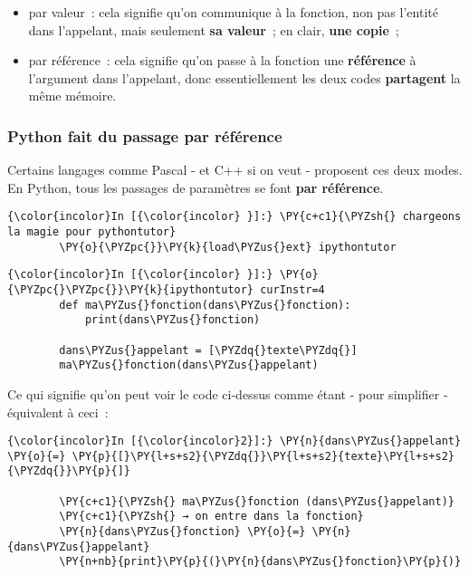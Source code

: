\begin{itemize}
	\item 
	par valeur~: cela signifie qu'on communique à la fonction, non pas l'entité
	dans l'appelant, mais seulement \textbf{sa valeur}~; en clair,
	\textbf{une copie}~;
	\item
	par référence~: cela signifie qu'on passe à la
	fonction une \textbf{référence} à l'argument dans l'appelant, donc
	essentiellement les deux codes \textbf{partagent} la même mémoire.
\end{itemize}

    \hypertarget{python-fait-du-passage-par-ruxe9fuxe9rence}{%
\subsubsection{Python fait du passage par
référence}\label{python-fait-du-passage-par-ruxe9fuxe9rence}}

    Certains langages comme Pascal - et C++ si on veut - proposent ces deux
modes. En Python, tous les passages de paramètres se font \textbf{par
référence}.

    \begin{Verbatim}[commandchars=\\\{\}]
{\color{incolor}In [{\color{incolor} }]:} \PY{c+c1}{\PYZsh{} chargeons la magie pour pythontutor}
        \PY{o}{\PYZpc{}}\PY{k}{load\PYZus{}ext} ipythontutor
\end{Verbatim}


    \begin{Verbatim}[commandchars=\\\{\}]
{\color{incolor}In [{\color{incolor} }]:} \PY{o}{\PYZpc{}\PYZpc{}}\PY{k}{ipythontutor} curInstr=4
        def ma\PYZus{}fonction(dans\PYZus{}fonction):
            print(dans\PYZus{}fonction)
            
        dans\PYZus{}appelant = [\PYZdq{}texte\PYZdq{}]
        ma\PYZus{}fonction(dans\PYZus{}appelant)
\end{Verbatim}


    Ce qui signifie qu'on peut voir le code ci-dessus comme étant - pour
simplifier - équivalent à ceci~:

    \begin{Verbatim}[commandchars=\\\{\}]
{\color{incolor}In [{\color{incolor}2}]:} \PY{n}{dans\PYZus{}appelant} \PY{o}{=} \PY{p}{[}\PY{l+s+s2}{\PYZdq{}}\PY{l+s+s2}{texte}\PY{l+s+s2}{\PYZdq{}}\PY{p}{]}
        
        \PY{c+c1}{\PYZsh{} ma\PYZus{}fonction (dans\PYZus{}appelant)}
        \PY{c+c1}{\PYZsh{} → on entre dans la fonction}
        \PY{n}{dans\PYZus{}fonction} \PY{o}{=} \PY{n}{dans\PYZus{}appelant}
        \PY{n+nb}{print}\PY{p}{(}\PY{n}{dans\PYZus{}fonction}\PY{p}{)}
\end{Verbatim}


